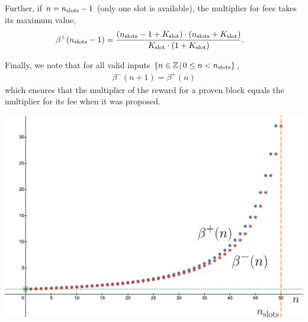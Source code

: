 \documentclass[9pt,oneside]{amsart}
\newenvironment{Figure}
  {\par\medskip\noindent\minipage{\linewidth}}
  {\endminipage\par\medskip}
\begin{document}
\begin{multicols}{2}
Further, if $n = n_\textnormal{slots}-1$ (only one slot is available),  the multiplier for fees takes its maximum value,
\begin{align}
\beta^+(n_\textnormal{slots}-1)
&= 
\frac{(n_\textnormal{slots}- 1 + K_\textnormal{slot} ) \cdot (n_\textnormal{slots} + K_\textnormal{slot})}{K_\textnormal{slot}\cdot (1 + K_\textnormal{slot})}.
\end{align}

Finally, we note that for all valid inputs $\{n\in \mathbb{Z} \hspace{0.02in}|\hspace{0.02in}  0 \leq n < n_\textnormal{slots} \}$,
\begin{align}
    \beta^-(n+1) = \beta^+(n)
\end{align}
which ensures that the multiplier of the reward for a proven block equals the multiplier for its fee when it was proposed.



\begin{Figure}
 \centering
 \includegraphics[width=0.8\linewidth]{fig/lambda10.png}
 \label{fig:f_slot_lambda1}
\end{Figure}


\end{multicols}
\end{document}
